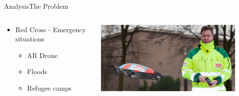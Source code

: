 \begin{frame}{Analysis}{The Problem}
    \begin{columns}[T]
        \begin{column}{.5\textwidth}
            \begin{itemize}
                \item Red Cross - Emergency situations
                \begin{itemize}
                    \item AR Drone
                    \item Floods
                    \item Refugee camps
                \end{itemize}
            \end{itemize}
        \end{column}
        \begin{column}{.5\textwidth}
            \includegraphics[width=0.9\textwidth]{images/red-cross_drone.jpg}
        \end{column}
    \end{columns}
\end{frame}

